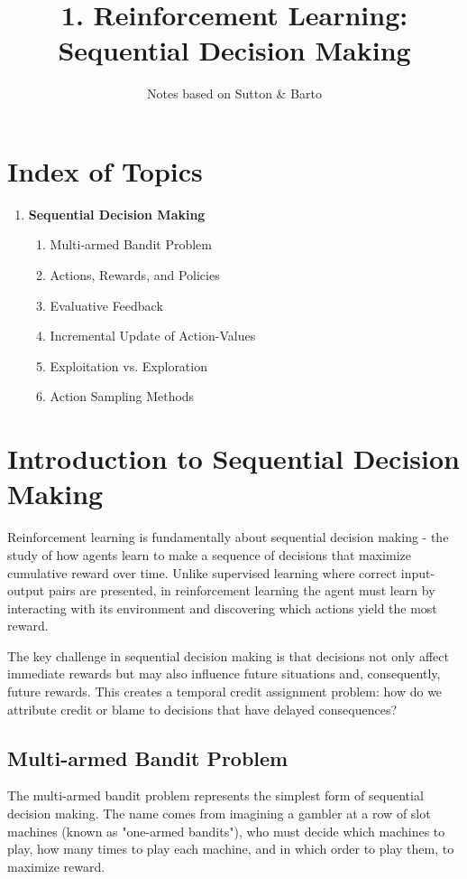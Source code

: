 \documentclass{article}
\title{1. Reinforcement Learning: Sequential Decision Making}
\author{Notes based on Sutton \& Barto}
\begin{document}
\usetikzlibrary{arrows.meta,shapes,positioning,shadows,trees,shapes.geometric,decorations.pathreplacing}

\maketitle
\tableofcontents
\newpage

\section{Index of Topics}
\begin{enumerate}[label=\arabic*.]
    \item \textbf{Sequential Decision Making}
    \begin{enumerate}[label=\arabic{enumi}.\arabic*.]
        \item Multi-armed Bandit Problem
        \item Actions, Rewards, and Policies
        \item Evaluative Feedback
        \item Incremental Update of Action-Values
        \item Exploitation vs. Exploration
        \item Action Sampling Methods
    \end{enumerate}
\end{enumerate}

\newpage

\section{Introduction to Sequential Decision Making}
Reinforcement learning is fundamentally about sequential decision making - the study of how agents learn to make a sequence of decisions that maximize cumulative reward over time. Unlike supervised learning where correct input-output pairs are presented, in reinforcement learning the agent must learn by interacting with its environment and discovering which actions yield the most reward.

The key challenge in sequential decision making is that decisions not only affect immediate rewards but may also influence future situations and, consequently, future rewards. This creates a temporal credit assignment problem: how do we attribute credit or blame to decisions that have delayed consequences?

\subsection{Multi-armed Bandit Problem}
The multi-armed bandit problem represents the simplest form of sequential decision making. The name comes from imagining a gambler at a row of slot machines (known as "one-armed bandits"), who must decide which machines to play, how many times to play each machine, and in which order to play them, to maximize reward.
\end{document}
